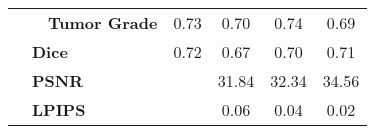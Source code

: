 \begin{table}[]
\begin{tabular}{cll|cccc}
                                     &                        & \textbf{Tumor Grade} &   0.73       &   0.70   &  0.74   &     0.69     \\ \cline{2-3}
                                     & \multicolumn{2}{l|}{\textbf{Dice}}            &  0.72        &   0.67   &  0.70   &     0.71     \\ \cline{2-3}
                                     & \multicolumn{2}{l|}{\textbf{PSNR}}            &   \cellcolor[HTML]{C0C0C0}      &   31.84   &  32.34   &     34.56     \\
                                     & \multicolumn{2}{l|}{\textbf{LPIPS}}           &   \cellcolor[HTML]{C0C0C0}       &   0.06   &  0.04   &     0.02     \\ \hline
    \end{tabular}
    \end{table}